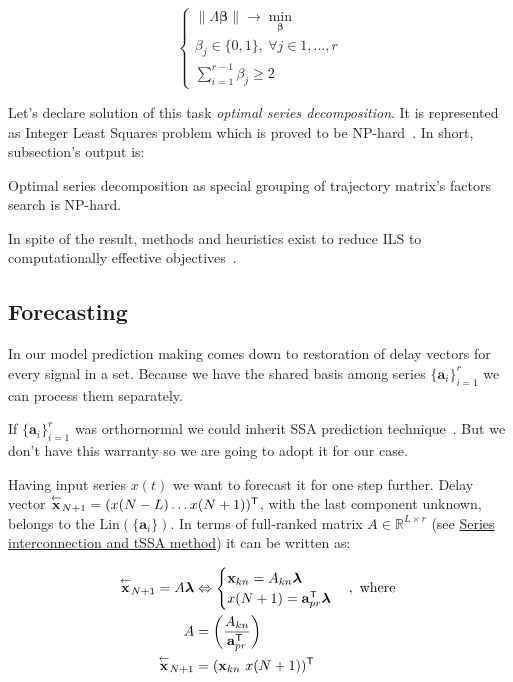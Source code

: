 	\begin{equation}\label{eq:decomp_search_final}
		\begin{cases*}
			\lVert \Lambda \boldsymbol{\beta} \rVert \to \underset{\boldsymbol{\beta}}{\min} \\
			\beta_j \in \{0, 1\}, \ \forall j \in 1, \ldots, r \\
			\sum\limits_{i = 1}^{r - 1} \beta_j \ge 2
		\end{cases*}
	\end{equation}
	
	Let's declare solution of this task \emph{optimal series decomposition}. It is represented as Integer Least Squares problem which is proved to be NP-hard~\cite{van1981another}. In short, subsection's output is:
	
	\begin{Th}
		Optimal series decomposition as special grouping of trajectory matrix's factors search is NP-hard.
	\end{Th}
	
	In spite of the result, methods and heuristics exist to reduce ILS to computationally effective objectives~\cite{Grafarend2022}.
	
	\subsection*{Forecasting}\label{sec:tssa_forecast}
	
	In our model prediction making comes down to restoration of delay vectors for every signal in a set. Because we have the shared basis among series $ \{\mathbf{a}_i\}_{i = 1}^r $ we can process them separately. 
	
	If $ \{\mathbf{a}_i\}_{i = 1}^r $ was orthornormal we could inherit SSA prediction technique~\cite{ecfb9dc578be43ae9ee8fc88b8ff9151}. But we don't have this warranty so we are going to adopt it for our case.
	
	Having input series $ x(t) $ we want to forecast it for one step further. Delay vector $ \overset{\leftarrow}{\mathbf{x}}_{N + 1} = (x(N - L) \ldots x(N + 1))^{\mathsf{T}} $, with the last component unknown, belongs to the $ \text{Lin}(\{\mathbf{a}_i\}) $. In terms of full-ranked matrix $ A \in \mathbb{R}^{L \times r} $ (see \hyperref[sec:tssa_method]{Series interconnection and tSSA method}) it can be written as:
	
	\begin{align}\label{eq:main_pred_for_A}
		\overset{\leftarrow}{\mathbf{x}}_{N + 1} = A \boldsymbol{\lambda} &\Leftrightarrow \begin{cases}
			\mathbf{x}_{kn} = A_{kn} \boldsymbol{\lambda}  \\
			x(N + 1) = \mathbf{a}_{pr}^{\mathsf{T}} \boldsymbol{\lambda}
		\end{cases}, \text{ where } \\
		A &= \left( \dfrac{A_{kn}}{\mathbf{a}_{pr}^{\mathsf{T}}} \right) \nonumber \\
		\overset{\leftarrow}{\mathbf{x}}_{N + 1} &= (\mathbf{x}_{kn} \  x(N + 1))^{\mathsf{T}} \nonumber
	\end{align}
	
